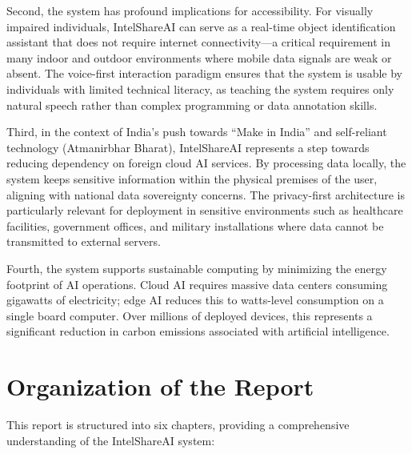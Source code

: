 \documentclass[12pt,a4paper]{report}
\begin{document}
Second, the system has profound implications for accessibility. For visually impaired individuals, IntelShareAI can serve as a real-time object identification assistant that does not require internet connectivity---a critical requirement in many indoor and outdoor environments where mobile data signals are weak or absent. The voice-first interaction paradigm ensures that the system is usable by individuals with limited technical literacy, as teaching the system requires only natural speech rather than complex programming or data annotation skills.

Third, in the context of India's push towards ``Make in India'' and self-reliant technology (Atmanirbhar Bharat), IntelShareAI represents a step towards reducing dependency on foreign cloud AI services. By processing data locally, the system keeps sensitive information within the physical premises of the user, aligning with national data sovereignty concerns. The privacy-first architecture is particularly relevant for deployment in sensitive environments such as healthcare facilities, government offices, and military installations where data cannot be transmitted to external servers.

Fourth, the system supports sustainable computing by minimizing the energy footprint of AI operations. Cloud AI requires massive data centers consuming gigawatts of electricity; edge AI reduces this to watts-level consumption on a single board computer. Over millions of deployed devices, this represents a significant reduction in carbon emissions associated with artificial intelligence.

\section{Organization of the Report}
This report is structured into six chapters, providing a comprehensive understanding of the IntelShareAI system:
\end{document}
